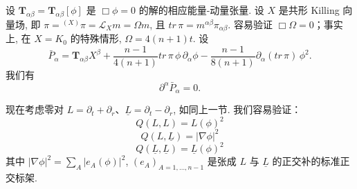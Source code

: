 \begin{lemma}\label{lem:c1-3.7}
设 $\mathbf{T}_{\alpha\beta} = \mathbf{T}_{\alpha\beta}[\phi]$ 是 $\Box\phi = 0$ 的解的相应能量-动量张量. 设 $X$ 是共形 Killing 向量场, 即 $\pi = {}^{(X)}\pi = \mathcal{L}_X m = \Omega m$, 且 $tr\, \pi = m^{\alpha\beta}\pi_{\alpha\beta}$. 容易验证 $\Box\Omega = 0$；事实上, 在 $X = K_0$ 的特殊情形, $\Omega = 4(n+1)t$. 设
\[
\bar{P}_\alpha = \mathbf{T}_{\alpha\beta}X^\beta + \frac{n-1}{4(n+1)}tr\, \pi\, \phi\, \partial_\alpha\phi - \frac{n-1}{8(n+1)}\partial_\alpha(tr\, \pi)\, \phi^2.
\]
我们有
\[
\partial^\alpha\bar{P}_\alpha = 0.
\]
\end{lemma}

现在考虑零对 $L = \partial_t + \partial_r$、$\underline{L} = \partial_t - \partial_r$, 如同上一节. 我们容易验证：
\begin{equation}
Q(L, L) = L(\phi)^2\label{eq:c1-78}
\end{equation}
\begin{equation}
Q(L, \underline{L}) = |\nabla\phi|^2\label{eq:c1-79}
\end{equation}
\begin{equation}
Q(\underline{L}, \underline{L}) = \underline{L}(\phi)^2\label{eq:c1-80}
\end{equation}
其中 $|\nabla\phi|^2 = \sum_A|e_A(\phi)|^2$, $(e_A)_{A=1, \dots, n-1}$ 是张成 $L$ 与 $\underline{L}$ 的正交补的标准正交标架. 
